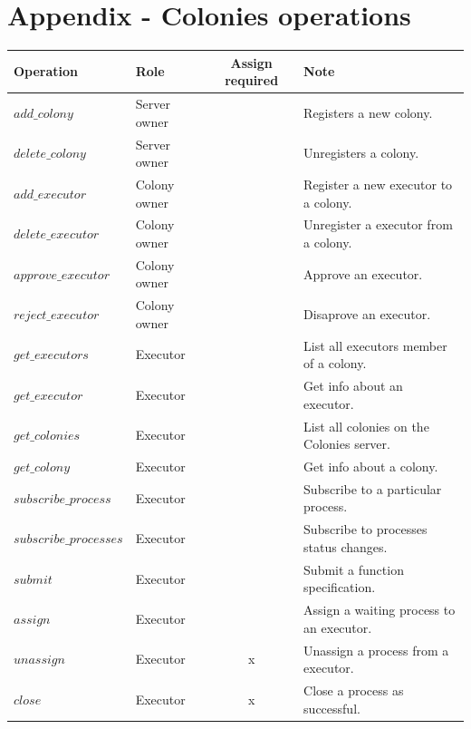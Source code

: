 \documentclass{article}
\begin{document}
\section{Appendix - Colonies operations}
\begin{table}[h]
	\centering
	\begin{tabular}{llcl}
		\toprule
		\cmidrule(r){1-4}
        Operation                  & Role         & Assign required & Note \\
		\midrule
        \(add\_colony\)            & Server owner &            & Registers a new colony. \\
        \(delete\_colony\)         & Server owner &            & Unregisters a colony. \\
        \(add\_executor\)          & Colony owner &            & Register a new executor to a colony. \\
        \(delete\_executor\)       & Colony owner &            & Unregister a executor from a colony. \\
        \(approve\_executor\)      & Colony owner &            & Approve an executor. \\
        \(reject\_executor\)       & Colony owner &            & Disaprove an executor. \\
        \(get\_executors\)         & Executor     &            & List all executors member of a colony. \\
        \(get\_executor\)          & Executor     &            & Get info about an executor. \\
        \(get\_colonies\)          & Executor     &            & List all colonies on the Colonies server. \\
        \(get\_colony\)            & Executor     &            & Get info about a colony. \\
        \(subscribe\_process\)     & Executor     &            & Subscribe to a particular process. \\
        \(subscribe\_processes\)   & Executor     &            & Subscribe to processes status changes. \\
        \(submit\)                 & Executor     &            & Submit a function specification. \\
        \(assign\)                 & Executor     &            & Assign a waiting process to an executor. \\
        \(unassign\)               & Executor     & x          & Unassign a process from a executor. \\
        \(close\)                  & Executor     & x          & Close a process as successful. \\

\end{tabular}
\end{table}
\end{document}
